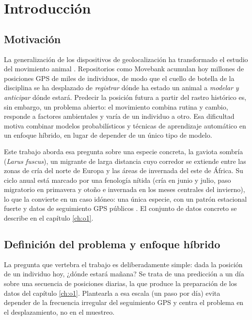 \chapter{Introducción}
\label{ch:intro}

\section{Motivación}
\label{sec:intro-motivacion}

La generalización de los dispositivos de geolocalización ha transformado el
estudio del movimiento animal \cite{kays2015}. Repositorios como Movebank acumulan
hoy millones de posiciones GPS de miles de individuos, de modo que el cuello de
botella de la
disciplina se ha desplazado de \emph{registrar} dónde ha estado un animal a
\emph{modelar y anticipar} dónde estará. Predecir la posición futura a partir del
rastro histórico es, sin embargo, un problema abierto: el movimiento combina
rutina y cambio, responde a factores ambientales y varía de un individuo a otro.
Esa dificultad motiva combinar modelos probabilísticos y técnicas de aprendizaje
automático en un enfoque híbrido, en lugar de depender de un único tipo de
modelo.

Este trabajo aborda esa pregunta sobre una especie concreta, la gaviota sombría
(\textit{Larus fuscus}), un migrante de larga distancia cuyo corredor se extiende
entre las zonas de cría del norte de Europa y las áreas de invernada del este de
África. Su ciclo anual está marcado por una fenología nítida (cría en junio y
julio, paso migratorio en primavera y otoño e invernada en los meses centrales
del invierno), lo que la convierte en un caso idóneo: una única especie, con un
patrón estacional fuerte y datos de seguimiento GPS públicos
\cite{movebank_gulls, wikelski2015}. El conjunto de datos concreto se describe en
el capítulo \ref{ch:o1}.

\section{Definición del problema y enfoque híbrido}
\label{sec:intro-enfoque}

La pregunta que vertebra el trabajo es deliberadamente simple: dada la posición
de un individuo hoy, ¿dónde estará mañana? Se trata de una predicción a un día
sobre una secuencia de posiciones diarias, la que produce la preparación de los
datos del capítulo \ref{ch:o1}. Plantearla a esa escala (un paso por día) evita
depender de la frecuencia irregular del seguimiento GPS y centra el problema en
el desplazamiento, no en el muestreo.

